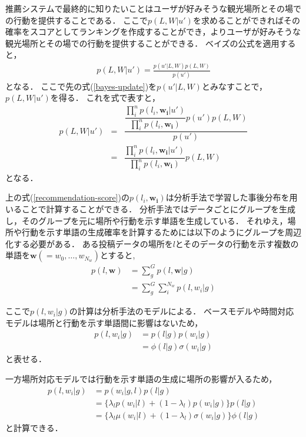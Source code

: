 \documentclass[a4j,10pt, twocolumn]{jarticle}
\begin{document}
推薦システムで最終的に知りたいことはユーザが好みそうな観光場所とその場での行動を提供することである．
ここで$p(L,W|u')$を求めることができればその確率をスコアとしてランキングを作成することができ，よりユーザが好みそうな観光場所とその場での行動を提供することができる．
ベイズの公式を適用すると，
\begin{eqnarray}
  p(L,W|u') = \frac{p(u'|L, W) p(L,W)}{p(u')}
\end{eqnarray}
となる．
ここで先の式(\ref{bayes-update})を$p(u'|L,W)$とみなすことで，$p(L,W|u')$を得る．
これを式で表すと，
\begin{eqnarray}
  p(L,W|u') &=& \dfrac{\dfrac{\prod_i^n p(l_i, \bm{w_i}|u')}{\prod_i^n p(l_i, \bm{w_i})} p(u')
 p(L,W)}{p(u')} \\
  \label{recommendation-score}
  &=& \dfrac{\prod_i^n p(l_i, \bm{w_i}|u')}{\prod_i^n p(l_i, \bm{w_i})} p(L,W)
\end{eqnarray}
となる．

上の式(\ref{recommendation-score})の$p(l_i, \bm{w_i})$は分析手法で学習した事後分布を用いることで計算することができる．
分析手法ではデータごとにグループを生成し，そのグループを元に場所や行動を示す単語を生成している．
それゆえ，場所や行動を示す単語の生成確率を計算するためには以下のようにグループを周辺化する必要がある．
ある投稿データの場所を$l$とそのデータの行動を示す複数の単語を$\bm{w}(=w_0, \dots, w_{N_w})$とすると,
\begin{align}
  p(l, \bm{w}) &= \sum_g^G p(l, \bm{w}|g) \\
  &= \sum_g^G \sum_i^{N_w} p(l, w_i|g)
\end{align}

ここで$p(l,w_i|g)$の計算は分析手法のモデルによる．
ベースモデルや時間対応モデルは場所と行動を示す単語間に影響はないため，
\begin{align}
  p(l, w_i|g) &= p(l|g) p(w_i|g)  \nonumber \\
  &= \phi(l|g) \sigma(w_i|g)
\end{align}
と表せる．

一方場所対応モデルでは行動を示す単語の生成に場所の影響が入るため，
\begin{align}
  p(l, w_i|g) &= p(w_i|g, l) p(l|g) \nonumber \\
  &= \{ \lambda_l p(w_i|l) + (1-\lambda_l) p(w_i|g) \} p(l|g) \\
  &= \{ \lambda_l \mu(w_i|l) + (1-\lambda_l) \sigma(w_i|g) \} \phi(l|g) \nonumber
\end{align}
と計算できる．

\end{document}
